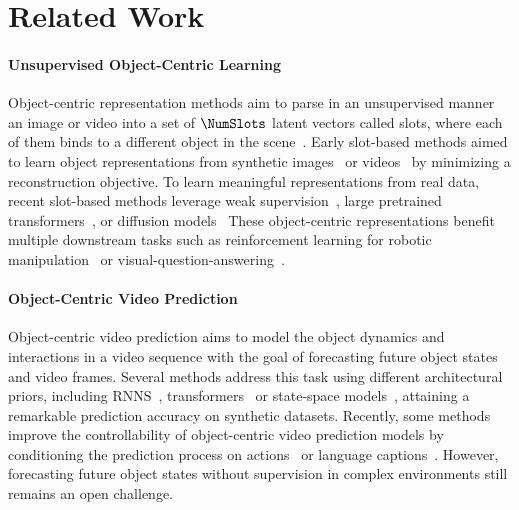 \section{Related Work}
\paragraph{Unsupervised Object-Centric Learning}
%
Object-centric representation methods aim to parse in an unsupervised manner an image or video into a set of $\NumSlots$ latent vectors called slots, where each of them binds to a different object in the scene~\cite{Greff_OnTheBindingProblemInNeuralNetworks_2020, Locatello_ChallengingAssumptionsInLearningOfDissentangledRepresentations_2019}.
%
Early slot-based methods aimed to learn object representations from synthetic images~\cite{Locatello_ObjectCentricLearningWithSlotAttention_2020, Singh_SLATE_2021, Biza_InvariantSlotAttention_2023} or videos~\cite{Kipf_ConditionalObjectCentricLearningFromVideo_2022, Creswell_UnsupervisedObjectBasedTransitionModelsFor3DPartiallyObservableEnvironments_2021, Singh_STEVE_2022} by minimizing a reconstruction objective.
%
To learn meaningful representations from real data, recent slot-based methods leverage weak supervision~\cite{Elsayed_SAVi++TowardsEndToEndObjectCentricLearningFromRealWorldVideos_2022, Bao_ObjectDiscoverMotion_2023}, large pretrained transformers~\cite{Seitzer_BridgingTheGapToRealWorldObjectCentricLearning_2023, Aydemir_SelfSupervisedObjectCentricLearningForVideos_2023, Zadaianchuk_VideoSaur_2024}, or diffusion models~\cite{Jiang_ObjectCentricSlotDiffusion_2023, Wu_SlotDiffusion_2023}
%
These object-centric representations benefit multiple downstream tasks such as reinforcement learning for robotic manipulation~\cite{Mosbach_SOLDReinforcementLearningSlotObjectCentricLatentDynamics, Ferraro_Focus_2023} or visual-question-answering~\cite{Mamaghan_ObjectCentricRepsForVQA_2024}.




\paragraph{Object-Centric Video Prediction}

Object-centric video prediction aims to model the object dynamics and interactions in a video sequence with the goal of forecasting future object states and video frames.
%
Several methods address this task using different architectural priors, including RNNS~\cite{Zoran_PARTS_2021, Assouel_VariationIdependentModulesVP_2022}, transformers~\cite{Villar_OCVP_2023, Wu_SlotFormer_2022, Daniel_DDLP_2024, Meo_ObjectCentricTemporalConsistency_2024} or state-space models~\cite{Jiang_SlotSSM_2024}, attaining a remarkable prediction accuracy on synthetic datasets.
%
Recently, some methods improve the controllability of object-centric video prediction models by conditioning the prediction process on actions~\cite{Mosbach_SOLDReinforcementLearningSlotObjectCentricLatentDynamics} or language captions~\cite{Wang_TIVDiffusion_2024}.
%
However, forecasting future object states without supervision in complex environments still remains an open challenge.




